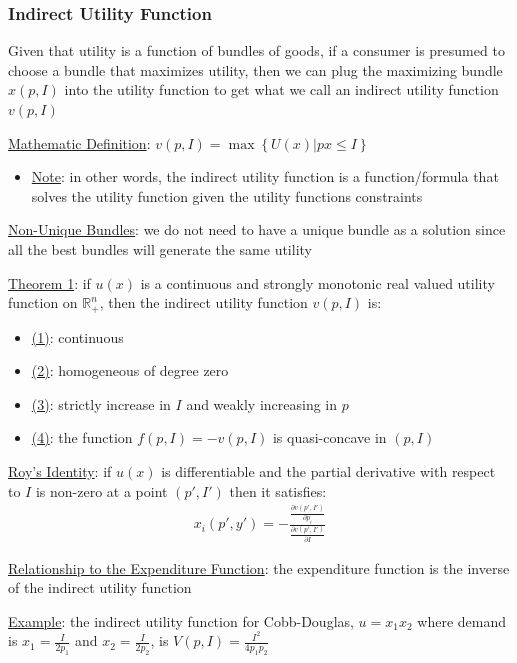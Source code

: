 \documentclass{article}
\begin{document}
\subsubsection{Indirect Utility Function}
Given that utility is a function of bundles of goods, if a consumer is presumed to choose a bundle that maximizes utility, then we can plug the maximizing bundle $x(p,I)$ into the utility function to get what we call an indirect utility function $v(p,I)$ \par \vspace{0.3em}
  \underline{Mathematic Definition}: $v(p,I) = \max \left\{U(x) | px \leq I \right\}$
  \begin{itemize}
    \item  \underline{Note}: in other words, the indirect utility function is a function/formula that solves the utility function given the utility functions constraints
  \end{itemize}
  \par
  \underline{Non-Unique Bundles}: we do not need to have a unique bundle as a solution since all the best bundles will generate the same utility
  \par
  \underline{Theorem 1}: if $u(x)$ is a continuous and strongly monotonic real valued utility function on $\mathbb{R}_{+}^{n}$, then the indirect utility function $v(p, I)$ is:
  \begin{itemize}
    \item  \underline{(1)}: continuous
    \item  \underline{(2)}: homogeneous of degree zero
    \item  \underline{(3)}: strictly increase in $I$ and weakly increasing in $p$
    \item  \underline{(4)}: the function $f(p, I) = -v(p,I)$ is quasi-concave in $(p,I)$
  \end{itemize}
  \par
  \underline{Roy's Identity}: if $u(x)$ is differentiable and the partial derivative with respect to $I$ is non-zero at a point $(p', I')$ then it satisfies:
  \begin{gather*}
    x_{i}(p', y') = -\frac{\tfrac{\partial v(p',I')}{\partial p_{i}}}{\tfrac{\partial v(p',I')}{\partial I}}
  \end{gather*}
  \par
  \underline{Relationship to the Expenditure Function}: the expenditure function is the inverse of the indirect utility function
  \par
  \underline{Example}: the indirect utility function for Cobb-Douglas, $u = x_{1}x_{2}$ where demand is $x_{1} = \tfrac{I}{2p_{1}}$ and $x_{2} = \tfrac{I}{2p_{2}}$, is $V(p,I) = \tfrac{I^{2}}{4p_{1}p_{2}}$
\end{document}
